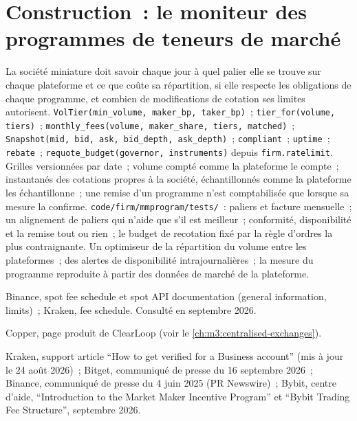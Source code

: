 \section{Construction~: le moniteur des programmes de teneurs de marché}\label{bld:m3:getting-access-crypto-venues:mmprogram}

\begin{build}
 La société miniature doit savoir chaque jour à quel palier elle se trouve sur chaque plateforme et ce que coûte sa répartition, si elle respecte les obligations de chaque
programme, et combien de modifications de cotation ses limites autorisent.
 \texttt{VolTier(min\_volume, maker\_bp, taker\_bp)}~; \texttt{tier\_for(volume, tiers)}~; \texttt{monthly\_fees(volume, maker\_share,
tiers, matched)}~; \texttt{Snapshot(mid, bid, ask, bid\_depth, ask\_depth)}~; \texttt{compliant}~; \texttt{uptime}~; \texttt{rebate}~; \texttt{requote\_budget(governor,
instruments)} depuis \texttt{firm.ratelimit}.
 Grilles versionnées par date~; volume compté comme la plateforme le compte~; instantanés des cotations propres à la société, échantillonnés comme la plateforme les échantillonne~; une
remise d'un programme n'est comptabilisée que lorsque sa mesure la confirme.
 \texttt{code/firm/mmprogram/tests/}~: paliers et facture mensuelle~; un alignement de paliers qui n'aide que s'il est meilleur~; conformité, disponibilité et
la remise tout ou rien~; le budget de recotation fixé par la règle d'ordres la plus contraignante.
 Un optimiseur de la répartition du volume entre les plateformes~; des alertes de disponibilité intrajournalières~; la mesure du programme reproduite
à partir des données de marché de la plateforme.
\end{build}

\begin{omsources}
\item Binance, spot fee schedule et spot API documentation (general information, limits)~; Kraken, fee schedule. Consulté en septembre 2026.
\item Copper, page produit de ClearLoop (voir le \cref{ch:m3:centralised-exchanges}).
\item Kraken, support article ``How to get verified for a Business account'' (mis à jour le 24 août 2026)~; Bitget, communiqué de presse du 16 septembre 2026~;
Binance, communiqué de presse du 4 juin 2025 (PR Newswire)~; Bybit, centre d'aide, ``Introduction to the Market Maker Incentive Program'' et
``Bybit Trading Fee Structure'', septembre 2026.
\end{omsources}

